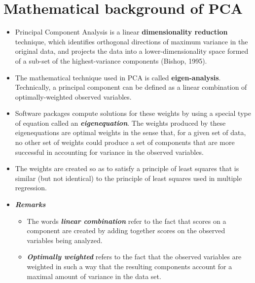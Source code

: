 \documentclass[]{article}
\begin{document}
\section{Mathematical background of PCA}

\begin{itemize}
\item Principal Component Analysis is a linear \textbf{dimensionality reduction} technique, which identifies orthogonal directions of maximum variance in the original data, and projects the data into a lower-dimensionality space formed of a sub-set of the highest-variance components (Bishop, 1995).


\item The mathematical technique used in PCA is called \textbf{eigen-analysis}. Technically, a principal component can be
defined as a linear combination of optimally-weighted observed variables. 
\item Software packages compute solutions for these weights by using a special
type of equation called an \textbf{\emph{eigenequation}}. The weights produced by these eigenequations are
optimal weights in the sense that, for a given set of data, no other set of weights could produce a
set of components that are more successful in accounting for variance in the observed variables.
\item The weights are created so as to satisfy a principle of least squares that is similar (but not identical) to
the principle of least squares used in multiple regression.

\item \textbf{\textit{Remarks}}
\begin{itemize}
	\item The words \textbf{\emph{linear combination}} refer to the fact that scores on a
	component are created by adding together scores on the observed variables being analyzed.
	\item \textbf{\emph{Optimally weighted}} refers to the fact that the observed variables are weighted in such a way
	that the resulting components account for a maximal amount of variance in the data set.
\end{itemize}
\end{itemize}
\newpage
\end{document}
